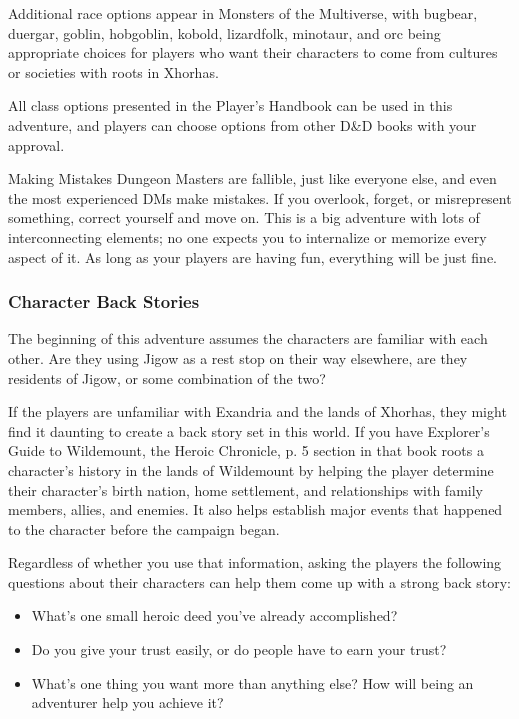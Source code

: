 \documentclass[a4paper, 11pt, bg=full, twocolumn, nooutline]{dndbook}
\begin{document}
Additional race options appear in Monsters of the Multiverse, with bugbear, duergar, goblin, hobgoblin, kobold, lizardfolk, minotaur, and orc being appropriate choices for players who want their characters to come from cultures or societies with roots in Xhorhas.

All class options presented in the Player's Handbook can be used in this adventure, and players can choose options from other D\&D books with your approval.

\begin{DndSidebar}{Making Mistakes}
Dungeon Masters are fallible, just like everyone else, and even the most experienced DMs make mistakes. If you overlook, forget, or misrepresent something, correct yourself and move on. This is a big adventure with lots of interconnecting elements; no one expects you to internalize or memorize every aspect of it. As long as your players are having fun, everything will be just fine.
\end{DndSidebar}

\subsubsection{Character Back Stories}

The beginning of this adventure assumes the characters are familiar with each other. Are they using Jigow as a rest stop on their way elsewhere, are they residents of Jigow, or some combination of the two?

If the players are unfamiliar with Exandria and the lands of Xhorhas, they might find it daunting to create a back story set in this world. If you have Explorer's Guide to Wildemount, the Heroic Chronicle, p. 5 section in that book roots a character's history in the lands of Wildemount by helping the player determine their character's birth nation, home settlement, and relationships with family members, allies, and enemies. It also helps establish major events that happened to the character before the campaign began.

Regardless of whether you use that information, asking the players the following questions about their characters can help them come up with a strong back story:

\begin{itemize}
\item What's one small heroic deed you've already accomplished?
\item Do you give your trust easily, or do people have to earn your trust?
\item What's one thing you want more than anything else? How will being an adventurer help you achieve it?
\end{itemize}
\end{document}

